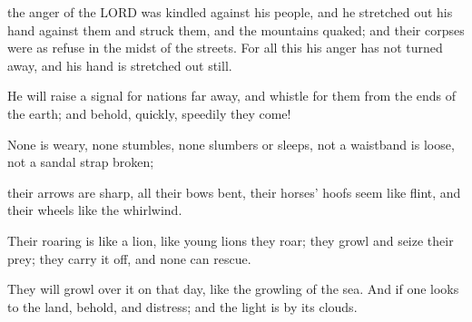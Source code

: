\documentclass[11pt]{article}
\begin{document}
\begin{biblicaloutline}[Isaiah 5:18-25 (B')]
\begin{versesection}{2em}
          the anger of the LORD was kindled against his people,
        \poetryline and he stretched out his hand against them and struck them,
        \poetryline and the mountains quaked;
        and their corpses were as refuse
        \poetryline in the midst of the streets.
        For all this his anger has not turned away,
        \poetryline and his hand is stretched out still.
    \end{versesection}

\end{biblicaloutline}

\begin{biblicaloutline}[Isaiah 5:26-30 (A')]

    \begin{versesection}{2em}
         He will raise a signal for nations far away,
        \poetryline and whistle for them from the ends of the earth;
        \poetryline and behold, quickly, speedily they come!
        
         None is weary, none stumbles,
        \poetryline none slumbers or sleeps,
        not a waistband is loose,
        \poetryline not a sandal strap broken;
        
         their arrows are sharp,
        \poetryline all their bows bent,
        their horses' hoofs seem like flint,
        \poetryline and their wheels like the whirlwind.
        
         Their roaring is like a lion,
        \poetryline like young lions they roar;
        they growl and seize their prey;
        \poetryline they carry it off, and none can rescue.
        
         They will growl over it on that day,
        \poetryline like the growling of the sea.
        And if one looks to the land,
        \poetryline behold,  and distress;
        and the light is  by its clouds.
    \end{versesection}

\end{biblicaloutline}
\end{document}
